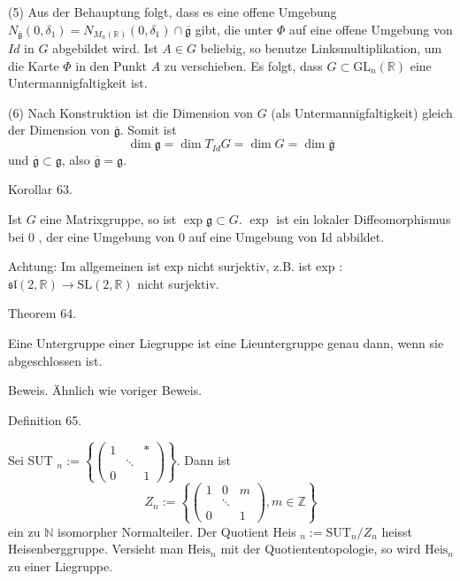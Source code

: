 \documentclass[10pt, letterpaper]{article}
\begin{document}
(5) Aus der Behauptung folgt, dass es eine offene Umgebung $N_{\overline{\mathfrak{g}}}\left(0, \delta_{1}\right)= N_{M_{n}(\mathbb{R})}\left(0, \delta_{1}\right) \cap \overline{\mathfrak{g}}$ gibt, die unter $\Phi$ auf eine offene Umgebung von $I d$ in $G$ abgebildet wird. Ist $A \in G$ beliebig, so benutze Linksmultiplikation, um die Karte $\Phi$ in den Punkt $A$ zu verschieben. Es folgt, dass $G \subset \mathrm{GL}_{n}(\mathbb{R})$ eine Untermannigfaltigkeit ist.

(6) Nach Konstruktion ist die Dimension von $G$ (als Untermannigfaltigkeit) gleich der Dimension von $\overline{\mathfrak{g}}$. Somit ist
$$
\operatorname{dim} \mathfrak{g}=\operatorname{dim} T_{I d} G=\operatorname{dim} G=\operatorname{dim} \overline{\mathfrak{g}}
$$
und $\overline{\mathfrak{g}} \subset \mathfrak{g}$, also $\overline{\mathfrak{g}}=\mathfrak{g}$.




Korollar 63. 

Ist $G$ eine Matrixgruppe, so ist $\exp \mathfrak{g} \subset G$. $\exp$ ist ein lokaler Diffeomorphismus bei 0 , der eine Umgebung von 0 auf eine Umgebung von Id abbildet.

Achtung: Im allgemeinen ist exp nicht surjektiv, z.B. ist exp : $\mathfrak{s} \mathfrak{l}(2, \mathbb{R}) \rightarrow \mathrm{SL}(2, \mathbb{R})$ nicht surjektiv.



Theorem 64. 

Eine Untergruppe einer Liegruppe ist eine Lieuntergruppe genau dann, wenn sie abgeschlossen ist.

Beweis. Ähnlich wie voriger Beweis.


Definition 65. 

Sei SUT $_{n}:=\left\{\left(\begin{array}{ccc}1 & & * \\ & \ddots & \\ 0 & & 1\end{array}\right)\right\}$. Dann ist
$$
Z_{n}:=\left\{\left(\begin{array}{ccc}
1 & 0 & m \\
& \ddots & \\
0 & & 1
\end{array}\right), m \in \mathbb{Z}\right\}
$$
ein zu $\mathbb{N}$ isomorpher Normalteiler. Der Quotient Heis ${ }_{n}:=\mathrm{SUT}_{n} / Z_{n}$ heisst Heisenberggruppe. Versieht man $\mathrm{Heis}_{n}$ mit der Quotiententopologie, so wird $\mathrm{Heis}_{n}$ zu einer Liegruppe.
\end{document}

